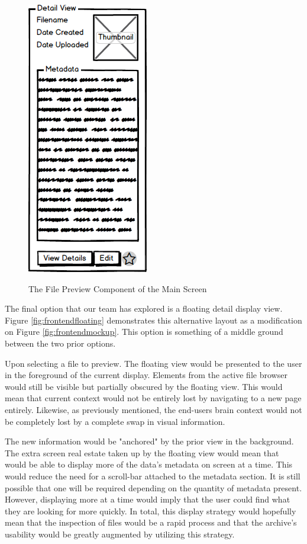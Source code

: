 \documentclass[12pt]{report}
\begin{document}
\begin{figure}[h]
	\centering
	\caption{The File Preview Component of the Main Screen}
	\includegraphics[scale=0.5]{frontend_file_preview}
	\label{fig:frontendfilepreview}
\end{figure}

The final option that our team has explored is a floating detail display view. Figure \ref{fig:frontendfloating} demonstrates this alternative layout as a modification on Figure \ref{fig:frontendmockup}. This option is something of a middle ground between the two prior options.

Upon selecting a file to preview. The floating view would be presented to the user in the foreground of the current display. Elements from the active file browser would still be visible but partially obscured by the floating view. This would mean that current context would not be entirely lost by navigating to a new page entirely. Likewise, as previously mentioned, the end-users brain context would not be completely lost by a complete swap in visual information. 

The new information would be "anchored" by the prior view in the background. The extra screen real estate taken up by the floating view would mean that would be able to display more of the data's metadata on screen at a time. This would reduce the need for a scroll-bar attached to the metadata section. It is still possible that one will be required depending on the quantity of metadata present. However, displaying more at a time would imply that the user could find what they are looking for more quickly. In total, this display strategy would hopefully mean that the inspection of files would be a rapid process and that the archive's usability would be greatly augmented by utilizing this strategy.
\end{document}
